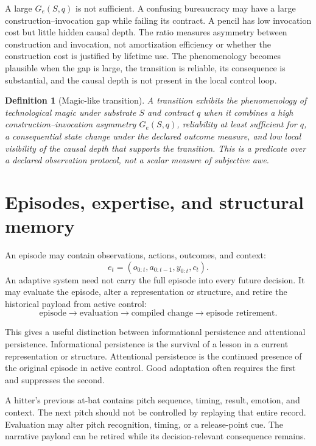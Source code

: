 \documentclass[11pt]{article}
\newtheorem{definition}{Definition}
\begin{document}
A large \(G_e(S,q)\) is not sufficient. A confusing bureaucracy may have a large construction--invocation gap while failing its contract. A pencil has low invocation cost but little hidden causal depth. The ratio measures asymmetry between construction and invocation, not amortization efficiency or whether the construction cost is justified by lifetime use. The phenomenology becomes plausible when the gap is large, the transition is reliable, its consequence is substantial, and the causal depth is not present in the local control loop.

\begin{definition}[Magic-like transition]
A transition exhibits the phenomenology of technological magic under substrate \(S\) and contract \(q\) when it combines a high construction--invocation asymmetry \(G_e(S,q)\), reliability at least sufficient for \(q\), a consequential state change under the declared outcome measure, and low local visibility of the causal depth that supports the transition. This is a predicate over a declared observation protocol, not a scalar measure of subjective awe.
\end{definition}

\section{Episodes, expertise, and structural memory}

An episode may contain observations, actions, outcomes, and context:
\[
e_t=(o_{0:t},a_{0:t-1},y_{0:t},c_t).
\]
An adaptive system need not carry the full episode into every future decision. It may evaluate the episode, alter a representation or structure, and retire the historical payload from active control:
\[
\text{episode}
\rightarrow\text{evaluation}
\rightarrow\text{compiled change}
\rightarrow\text{episode retirement}.
\]

This gives a useful distinction between informational persistence and attentional persistence. Informational persistence is the survival of a lesson in a current representation or structure. Attentional persistence is the continued presence of the original episode in active control. Good adaptation often requires the first and suppresses the second.

A hitter's previous at-bat contains pitch sequence, timing, result, emotion, and context. The next pitch should not be controlled by replaying that entire record. Evaluation may alter pitch recognition, timing, or a release-point cue. The narrative payload can be retired while its decision-relevant consequence remains.
\end{document}
